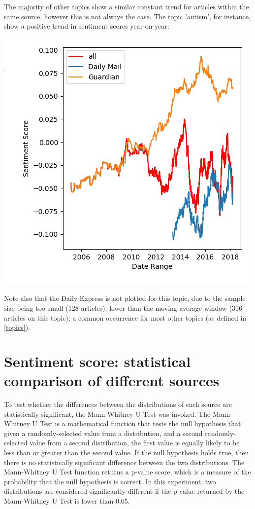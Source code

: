 \documentclass{report}
\begin{document}
The majority of other topics show a similar constant trend for articles within the same source, however this is not always the case. The topic 'autism', for instance, show a positive trend in sentiment scores year-on-year:

\begin{center}
	\includegraphics[width=0.5\linewidth]{autism.png}
\end{center}

Note also that the Daily Express is not plotted for this topic, due to the sample size being too small (128 articles), lower than the moving average window (316 articles on this topic); a common occurrence for most other topics (as defined in \ref{topics}).

\section{Sentiment score: statistical comparison of different sources} \label{Sentiment score: statistical comparison of different sources}

To test whether the differences between the distributions of each source are statistically significant, the Mann-Whitney U Test \cite{mann1947test} was invoked.
The Mann-Whitney U Test is a mathematical function that tests the null hypothesis that given a randomly-selected value from a distribution, and a second randomly-selected value from a second distribution, the first value is equally likely to be less than or greater than the second value.
If the null hypothesis holds true, then there is no statistically significant difference between the two distributions.
The Mann-Whitney U Test function returns a p-value score, which is a measure of the probability that the null hypothesis is correct.
In this experiment, two distributions are considered significantly different if the p-value returned by the Mann-Whitney U Test is lower than 0.05.
\end{document}
